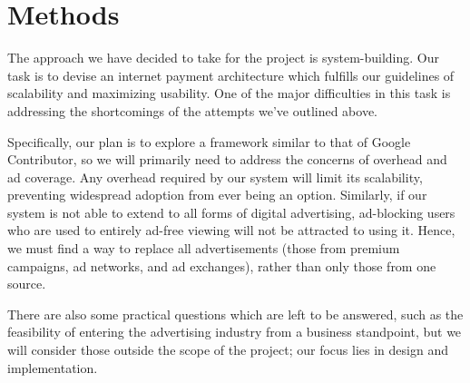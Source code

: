 \section{Methods}
The approach we have decided to take for the project is
system-building. Our task is to devise an internet payment
architecture which fulfills our guidelines of scalability and
maximizing usability. One of the major difficulties in this task is
addressing the shortcomings of the attempts we've outlined above.

Specifically, our plan is to explore a framework similar to that of
Google Contributor, so we will primarily need to address the concerns of
overhead and ad coverage. Any overhead required by our system will
limit its scalability, preventing widespread adoption from ever being
an option. Similarly, if our system is not able to extend to all forms
of digital advertising, ad-blocking users who are used to entirely
ad-free viewing will not be attracted to using it. Hence, we must find a
way to replace all advertisements (those from premium campaigns, ad
networks, and ad exchanges), rather than only those from one source.

There are also some practical questions which are left to be answered,
such as the feasibility of entering the advertising industry from a
business standpoint, but we will consider those outside the scope of
the project; our focus lies in design and implementation.
